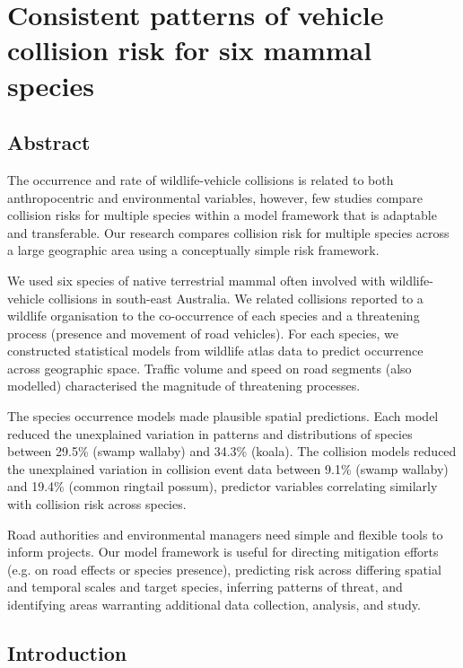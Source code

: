 \chapter{Consistent patterns of vehicle collision risk for six mammal species}\label{sec:6sp}
\newpage

\begin{localsize}{11}
\section*{\centering Abstract}

The occurrence and rate of wildlife-vehicle collisions is related to both anthropocentric and environmental variables, however, few studies compare collision risks for multiple species within a model framework that is adaptable and transferable.  Our research compares collision risk for multiple species across a large geographic area using a conceptually simple risk framework.

We used six species of native terrestrial mammal often involved with wildlife-vehicle collisions in south-east Australia.  We related collisions reported to a wildlife organisation to the co-occurrence of each species and a threatening process (presence and movement of road vehicles). For each species, we constructed statistical models from wildlife atlas data to predict occurrence across geographic space. Traffic volume and speed on road segments (also modelled) characterised the magnitude of threatening processes.

The species occurrence models made plausible spatial predictions. Each model reduced the unexplained variation in patterns and distributions of species between 29.5\% (swamp wallaby) and 34.3\% (koala). The collision models reduced the unexplained variation in collision event data between 9.1\% (swamp wallaby) and 19.4\% (common ringtail possum), predictor variables correlating similarly with collision risk across species.

Road authorities and environmental managers need simple and flexible tools to inform projects. Our model framework is useful for directing mitigation efforts (e.g. on road effects or species presence), predicting risk across differing spatial and temporal scales and target species, inferring patterns of threat, and identifying areas warranting additional data collection, analysis, and study.

\end{localsize}

\newpage
\section{Introduction}

